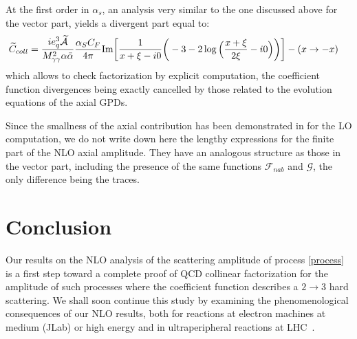 \documentclass[aps,prd,superscriptaddress,floatfix,showpacs]{revtex4}
\begin{document}
At the first order in $\alpha_s$, an analysis very similar to the one discussed above for the vector part, yields a  divergent  part equal to:
\begin{align}
\widetilde{C}_{coll} = \frac{ie_q^3 \widetilde{\mathcal{A}}}{ M^2_{\gamma\gamma} \alpha \bar{\alpha} } \frac{\alpha_S C_F}{4\pi} 
&  \mathrm{Im} \bigg[ \frac{1}{x+\xi-i0} \bigg( -3- 2
\log \Big{(} \frac{x+\xi}{2\xi} - i0 \Big{)}  \bigg) \bigg] - (x \rightarrow -x)
\end{align}
which allows to check  factorization by explicit computation, the coefficient function divergences being exactly cancelled by those related to the evolution equations of the axial GPDs. 

Since the smallness of the axial contribution has been demonstrated in \cite{Pedrak:2017cpp} for the LO computation,  we do not write down here the lengthy expressions for the finite part of the NLO axial amplitude. They have an analogous structure as those in the vector part, including the presence of the same functions $\mathcal{F}_{nab}$ and $\mathcal{G}$, the only difference being the traces.


\section{Conclusion}
Our results on the NLO analysis of the scattering amplitude of process \eqref{process} is a first step toward a complete proof of QCD collinear factorization for the amplitude of such processes where the coefficient function describes a $2\to 3$ hard scattering.   We shall soon continue this study by examining the phenomenological consequences of our NLO results, both for reactions at electron machines at medium (JLab) or high energy \cite{AbdulKhalek:2021gbh,Anderle:2021wcy} and in ultraperipheral reactions at LHC~\cite{Pire:2008ea}. 
\end{document}
